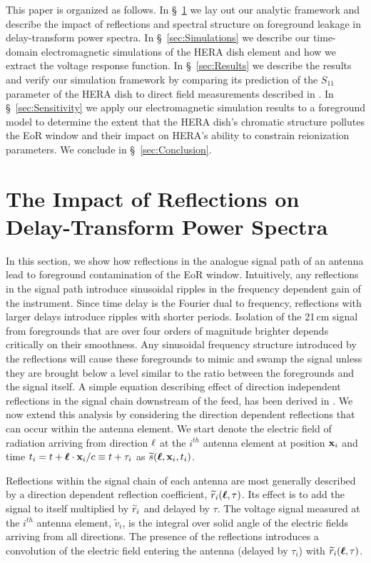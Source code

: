 \documentclass[twocolumn]{emulateapj}
\begin{document}
This paper is organized as follows. In \S~\ref{sec:Formalism} we lay out our analytic framework and describe the impact of reflections and spectral structure on foreground leakage in delay-transform power spectra. In \S~\ref{sec:Simulations} we describe our time-domain electromagnetic simulations of the HERA dish element and how we extract the voltage response function. In \S~\ref{sec:Results} we describe the results and verify our simulation framework by comparing its prediction of the $S_{11}$ parameter of the HERA dish to direct field measurements described in \citep{Patra:2016}. In \S~\ref{sec:Sensitivity} we apply our electromagnetic simulation results to a foreground model to determine the extent that the HERA dish's chromatic structure pollutes the EoR window and their impact on HERA's ability to constrain reionization parameters. We conclude in \S~\ref{sec:Conclusion}.

\section{The Impact of Reflections on Delay-Transform Power Spectra}\label{sec:Formalism}
In this section, we show how reflections in the analogue signal path of an antenna lead to foreground contamination of the EoR window. Intuitively, any reflections in the signal path introduce sinusoidal ripples in the frequency dependent gain of the instrument. Since time delay is the Fourier dual to frequency, reflections with larger delays introduce ripples with shorter periods. Isolation of the 21\,cm signal from foregrounds that are over four orders of magnitude brighter depends critically on their smoothness. Any sinusoidal frequency structure introduced by the reflections will cause these foregrounds to mimic and swamp the signal unless they are brought below a level similar to the ratio between the foregrounds and the signal itself. A simple equation describing effect of direction independent reflections in the signal chain downstream of the feed, has been derived in \citet{EwallWice:2015a}. We now extend this analysis by considering the direction dependent reflections that can occur within the antenna element. 
We start denote the electric field of radiation arriving from direction ${\bf \ell}$ at the $i^{th}$ antenna element at position ${\bf x}_i$ and time $t_i = t + \boldsymbol{\ell} \cdot {\bf x}_i /c \equiv t+\tau_i$ as ${\widetilde{s}}(\boldsymbol{\ell},{\bf x}_i,t_i)$. 

Reflections within the signal chain of each antenna are most generally described by a direction dependent reflection coefficient, ${\widetilde{r}}_i(\boldsymbol{\ell},\tau)$. Its effect is to add the signal to itself multiplied by ${\widetilde{r}}_i$ and delayed by $\tau$. The voltage signal measured at the $i^{th}$ antenna element, $\widetilde{v}_i$, is the integral over solid angle of the electric fields arriving from all directions. The presence of the reflections introduces a convolution of the electric field entering the antenna (delayed by $\tau_i$) with ${\widetilde{r}}_i(\boldsymbol{\ell},\tau)$.
\end{document}
